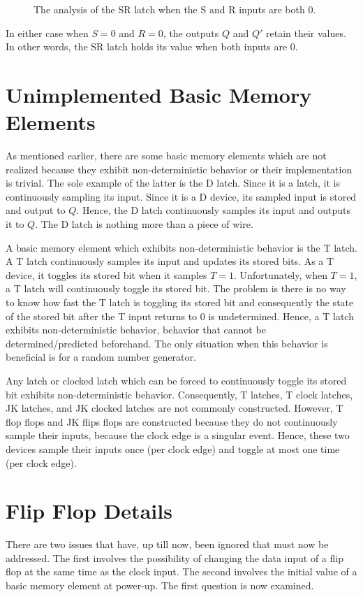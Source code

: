 \begin{figure}[ht]
\center{\texttt{[image: SR1]}}
\caption{The analysis of the SR latch when the S and R
inputs are both 0.}
\label{fig:sequentialCirSRL1}
\end{figure}

In either case when $S=0$ and $R=0$, the outputs $Q$ and $Q'$ retain 
their values.  In other words, the SR latch holds its value when 
both inputs are 0. 

\section{Unimplemented Basic Memory Elements}
As mentioned earlier, there are some basic memory elements 
which are not realized because they exhibit non-deterministic 
behavior or their implementation is trivial.  The sole example
of the latter is the D latch.  
Since it is a latch, it is continuously sampling its input.  Since it is a 
D device, its sampled input is stored and output to $Q$. Hence, the 
D latch continuously samples its input and outputs it to $Q$.
The D latch is nothing more than a piece of wire.

A basic memory element which exhibits non-deterministic behavior
is the  T latch.   A T latch continuously samples
its input and updates its stored bits.  As a T device, it toggles
its stored bit when it samples $T=1$.  Unfortunately, when $T=1$,
a T latch will continuously toggle its stored bit. The problem is 
there is no way to know how fast the T latch is toggling its stored 
bit and consequently the state of the stored bit after the T input 
returns to 0 is undetermined.  Hence, a T latch exhibits 
non-deterministic behavior, behavior that cannot be 
determined/predicted beforehand.  The only situation when this 
behavior is beneficial is for a random number generator.  

Any latch or clocked latch which can be forced to continuously toggle 
its stored bit exhibits non-deterministic behavior.  Consequently,
T latches, T clock latches, JK latches, and JK clocked latches are
not commonly constructed.  However, T flop flops and JK flips flops
are constructed because they do not continuously sample their inputs,
because the clock edge is a singular event.  Hence, these two devices
sample their inputs once (per clock edge) and toggle at most
one time (per clock edge).

\section{Flip Flop Details}
There are two issues that have, up till now, been ignored
that must now be addressed.  The first involves
the possibility of changing the data input of a flip flop at the
same time as the clock input.  The second involves the initial
value of a basic memory element at power-up. The first question
is now examined.

